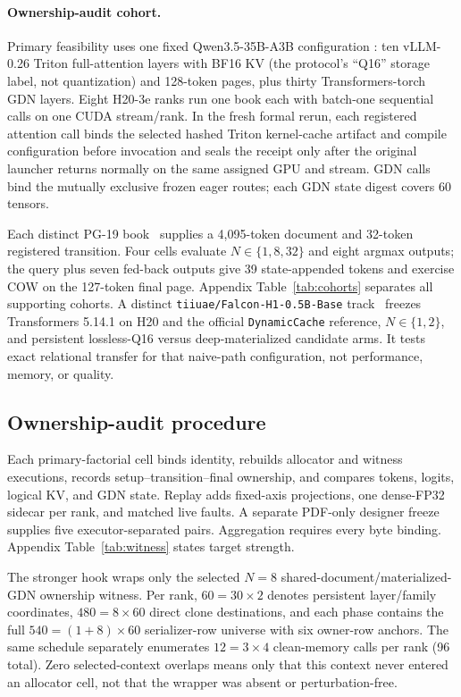\documentclass{article}
\begin{document}
\paragraph{Ownership-audit cohort.}

Primary feasibility uses one fixed Qwen3.5-35B-A3B configuration
\citep{qwen2026qwen35,qwen2026qwen35modelcard}: ten vLLM-0.26 Triton
full-attention layers with BF16 KV (the protocol's ``Q16'' storage label, not
quantization) and 128-token pages, plus thirty
Transformers-torch GDN layers.  Eight H20-3e ranks run one book each with
batch-one sequential calls on one CUDA stream/rank.  In the fresh formal rerun,
each registered attention call binds the selected hashed Triton kernel-cache
artifact and compile configuration before invocation and seals the receipt only
after the original launcher returns normally on the same assigned GPU and
stream.  GDN calls bind the mutually exclusive frozen eager
routes; each GDN state digest covers 60 tensors.

Each distinct PG-19 book~\citep{rae2020compressive} supplies a 4,095-token
document and 32-token registered transition.  Four cells evaluate
$N\in\{1,8,32\}$ and eight argmax outputs; the query plus seven fed-back outputs
give 39 state-appended tokens and exercise COW on the 127-token final page.
Appendix Table~\ref{tab:cohorts} separates all supporting cohorts.  A distinct
\texttt{tiiuae/Falcon-H1-0.5B-Base} track~\citep{zuo2025falconh1} freezes
Transformers 5.14.1 on H20 and the official
\texttt{DynamicCache} reference, $N\in\{1,2\}$, and persistent lossless-Q16
versus deep-materialized candidate arms.  It tests exact relational transfer
for that naive-path configuration, not performance, memory, or quality.

\subsection{Ownership-audit procedure}

Each primary-factorial cell binds identity, rebuilds allocator and witness
executions, records setup--transition--final ownership, and compares tokens,
logits, logical KV, and GDN state.  Replay adds fixed-axis projections, one
dense-FP32 sidecar per rank, and matched live faults.  A separate PDF-only
designer freeze supplies five executor-separated pairs.  Aggregation requires
every byte binding.  Appendix Table~\ref{tab:witness} states target strength.

The stronger hook wraps only the selected $N=8$
shared-document/materialized-GDN ownership witness.  Per rank,
$60=30\times2$ denotes persistent layer/family coordinates,
$480=8\times60$ direct clone destinations, and each phase contains the full
$540=(1+8)\times60$ serializer-row universe with six owner-row anchors.  The
same schedule separately enumerates $12=3\times4$ clean-memory calls per rank
(96 total).  Zero selected-context overlaps means only that this context never
entered an allocator cell, not that the wrapper was absent or perturbation-free.
\end{document}
